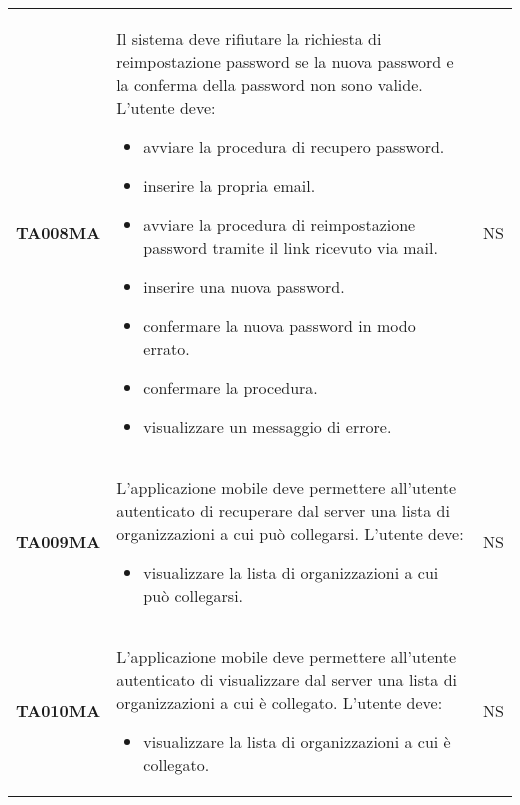 \documentclass[../../piano-di-qualifica.tex]{subfiles}
\begin{document}
\begin{longtable}[H]{>{\centering\bfseries}m{3cm} >{}m{10cm} >{\centering\arraybackslash}m{3cm}}
  TA008MA           & Il sistema deve rifiutare la richiesta di reimpostazione password se la nuova password e la conferma della password non sono valide. \newline
  L'utente deve:
  \begin{itemize}
    \item avviare la procedura di recupero password.
    \item inserire la propria email.
    \item avviare la procedura di reimpostazione password tramite il link ricevuto via mail.
    \item inserire una nuova password.
    \item confermare la nuova password in modo errato.
    \item confermare la procedura.
    \item visualizzare un messaggio di errore.
  \end{itemize}
                    & NS                                                                                                                                                                                                                                                               \\
  TA009MA           & L'applicazione mobile deve permettere all'utente autenticato di recuperare dal server una lista di organizzazioni a cui può collegarsi. \newline
  L'utente deve:
  \begin{itemize}
    \item visualizzare la lista di organizzazioni a cui può collegarsi.
  \end{itemize}
                    & NS                                                                                                                                                                                                                                                               \\
  TA010MA           & L'applicazione mobile deve permettere all'utente autenticato di visualizzare dal server una lista di organizzazioni a cui è collegato. \newline
  L'utente deve:
  \begin{itemize}
    \item visualizzare la lista di organizzazioni a cui è collegato.
  \end{itemize}
                    & NS                                                                                                                                                                                                                                                               \\

\end{longtable}
\end{document}
